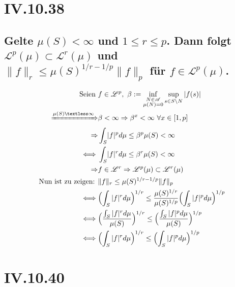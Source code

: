 \documentclass[12pt,a4paper]{article}
\begin{document}
\pagestyle{fancy}
\fancyhf{}
\rfoot{\thepage}

\section*{IV.10.38}
\subsection*{Gelte $\mu(S) < \infty$ und $1\leq r \leq p$. Dann folgt $\mathscr{L}^p(\mu) \subset \mathscr{L}^r(\mu)$ und $\lVert f \rVert_r \leq \mu(S)^{1/r - 1/p}\lVert f \rVert_p$ für $f \in \mathscr{L}^p(\mu)$. }
\begin{align*}
	\text{Seien } &f \in \mathscr{L}^p , \ \beta := \inf_{\substack{N \in \mathscr{A} \\ \mu(N)=0}} \sup_{s \in S\setminus N}|f(s)|\\
	\xRightarrow{\mu(S)\textless \infty} & \beta < \infty \Rightarrow \beta^x < \infty \ \forall x \in [1,p]\\
	\Rightarrow &\int_S \lvert f \rvert^p d\mu \leq \beta^p \mu(S) < \infty\\
	\iff &\int_S \lvert f \rvert^r d\mu\leq \beta^r \mu(S) < \infty\\
	\Rightarrow & f \in \mathscr{L}^r \Rightarrow \mathscr{L}^p(\mu) \subset \mathscr{L}^r(\mu)\\
	\text{Nun ist zu zeigen: } &\lVert f \rVert_r \leq \mu(S)^{1/r - 1/p}\lVert f \rVert_p\\
	\iff & \Bigl( \int_{S}|f|^rd\mu\Bigr)^{1/r} \leq \frac{\mu(S)^{1/r}}{\mu(S)^{1/p}}\Bigl( \int_{S}|f|^pd\mu\Bigr)^{1/p}\\
	\iff & \Bigl( \frac{\int_{S}|f|^rd\mu}{\mu(S)}\Bigr)^{1/r} \leq \Bigl( \frac{\int_{S}|f|^pd\mu}{\mu(S)}\Bigr)^{1/p}\\
	\iff & \Bigl( \int_{S}|f|^rd\mu\Bigr)^{1/r} \leq \Bigl( \int_{S}|f|^pd\mu\Bigr)^{1/p}\\
\end{align*}

\section*{IV.10.40}
\end{document}
